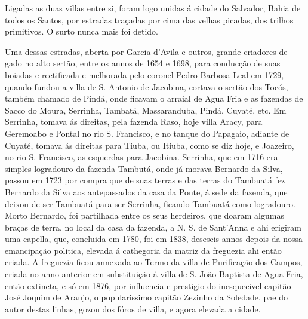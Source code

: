  \newpage Ligadas as duas villas entre si, foram logo unidas á cidade do Salvador, Bahia de todos os Santos, por estradas traçadas por cima das velhas picadas, dos trilhos primitivos. O surto nunca mais foi detido.
 
 Uma dessas  estradas, aberta por Garcia d'Avila e outros,  grande criadores de gado no alto sertão, entre os  annos de 1654 e 1698, para conducção de suas boiadas e rectificada e melhorada pelo coronel Pedro  Barbosa Leal em 1729, quando fundou a villa de S. Antonio de Jacobina,  cortava o sertão  dos Tocós, também chamado de Pindá, onde ficavam o arraial de  Agua Fria e as fazendas de Sacco do Moura, Serrinha, Tambatá, Massaranduba, Pindá, Cuyaté, etc. Em Serrinha, tomava ás direitas, pela fazenda  Raso, hoje villa Aracy, para Geremoabo e Pontal no rio S. Francisco, e  no tanque do Papagaio, adiante de Cuyaté, tomava ás direitas para Tiuba, ou Itiuba, como se diz hoje, e Joazeiro, no rio S. Francisco, as esquerdas para Jacobina. Serrinha, que em 1716 era simples logradouro da fazenda Tambutá, onde já morava Bernardo da Silva, passou em 1723 por compra que de suas terras e das terras do Tambuatá fez Bernardo da Silva aos antepassados da casa da Ponte, á sede da  fazenda, que deixou de ser Tambuatá para ser Serrinha, ficando Tambuatá como logradouro. Morto Bernardo, foi partilhada entre os seus herdeiros, que doaram algumas braças de terra, no local da casa da fazenda, a N. S. de Sant'Anna e ahi erigiram uma capella, que, concluida em 1780, foi em 1838, deseseis annos depois da  nossa emancipação  politica, elevada á cathegoria da  matriz da freguezia ahi então criada. A freguezia ficou annexada ao Termo da villa  de Purificação dos Campos, criada no anno anterior em substituição á villa de S. João Baptista de Agua Fria, então extincta, e só em 1876, por influencia e prestigio do inesquecivel capitão José  Joquim de Araujo, o popularissimo capitão Zezinho da Soledade, pae do autor destas linhas, gozou dos fóros de villa, e agora elevada a cidade.
 
 

